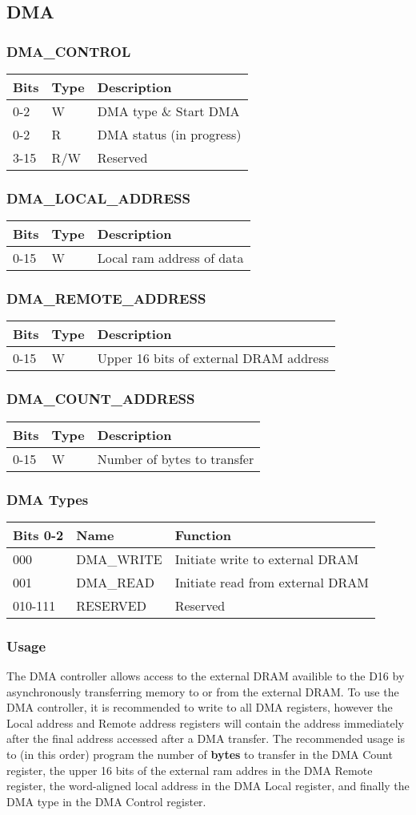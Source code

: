 \documentclass{article}
\newcommand{\regdesc}[2]{
  \subsubsection{#1}
  \begin{tabular}{|l|l|l|}
    \hline
    Bits & Type & Description \\ \hline
    #2
  \end{tabular}
}
\begin{document}
        \subsection{DMA}
        \regdesc{DMA\_CONTROL}{
          0-2 & W & DMA type \& Start DMA \\ \hline
          0-2 & R & DMA status (in progress) \\ \hline
          3-15 & R/W & Reserved \\ \hline
        }
        \regdesc{DMA\_LOCAL\_ADDRESS}{
          0-15 & W & Local ram address of data \\ \hline
        }
        \regdesc{DMA\_REMOTE\_ADDRESS}{
          0-15 & W & Upper 16 bits of external DRAM address\\ \hline
        }
        \regdesc{DMA\_COUNT\_ADDRESS}{
          0-15 & W & Number of bytes to transfer \\ \hline
        }
        \subsubsection{DMA Types}
        \begin{tabular}{|l|l|l|}
          \hline
          Bits 0-2 & Name & Function \\ \hline
          000 & DMA\_WRITE & Initiate write to external DRAM \\ \hline
          001 & DMA\_READ & Initiate read from external DRAM \\ \hline
          010-111 & RESERVED & Reserved \\ \hline
        \end{tabular}
        \subsubsection{Usage}
        The DMA controller allows access to the external DRAM availible to the
        D16 by asynchronously transferring memory to or from the external DRAM.
        To use the DMA controller, it is recommended to write to all DMA
        registers, however the Local address and Remote address registers will
        contain the address immediately after the final address accessed after a
        DMA transfer. The recommended usage is to (in this order) program the
        number of \textbf{bytes} to transfer in the DMA Count register, the
        upper 16 bits of the external ram addres in the DMA Remote register, the
        word-aligned local address in the DMA Local register, and finally the
        DMA type in the DMA Control register.
        
        
\end{document}
